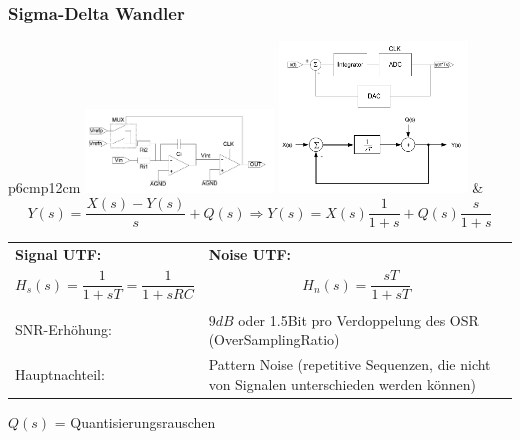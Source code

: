 \subsubsection{Sigma-Delta Wandler }
  \begin{longtable}{p{6cm}p{12cm}}
    \includegraphics[width=5cm, valign=t]{images/deltaSigma1} \newline 
    \includegraphics[width=5cm]{images/deltaSigma3} &
    \[Y(s)=\frac{X(s)-Y(s)}{s}+Q(s)\Rightarrow Y(s)=X(s)\frac{1}{1+s}+Q(s)\frac{s}{1+s}\] \newline
    \begin{tabular}{p{5cm}p{7cm}}
      \textbf{Signal UTF:} &
      \textbf{Noise UTF:} \\
      
      \[ H_s(s) = \frac{1}{1+sT} = \frac{1}{1+sRC} \] &    
      \[ H_n(s) = \frac{sT}{1+sT} \] \\ \\
      
      SNR-Erhöhung: &
      $9dB$ oder 1.5Bit pro Verdoppelung des OSR (OverSamplingRatio) \\
      Hauptnachteil: &
      Pattern Noise (repetitive Sequenzen, die nicht von Signalen unterschieden werden können)
    \end{tabular}
    $Q(s)$ = Quantisierungsrauschen
    
  \end{longtable}

	

